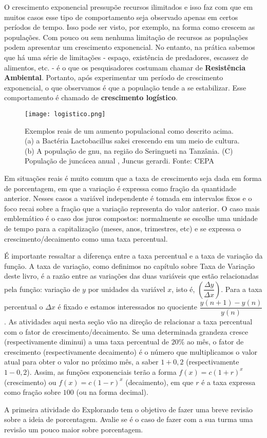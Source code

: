 \begin{reflection}
O crescimento exponencial pressupõe recursos ilimitados e isso faz com que em muitos casos esse tipo de comportamento seja observado apenas em certos períodos de tempo. Isso pode ser visto, por exemplo, na forma como crescem as populações. Com pouco ou sem nenhuma limitação de recursos as populações podem apresentar um crescimento exponencial. No entanto, na prática sabemos que há uma série de limitações - espaço, existência de predadores, escassez de alimentos, etc. - é o que os pesquisadores costumam chamar de \textbf{Resistência Ambiental}. Portanto, após experimentar um período de crescimento exponencial, o que observamos é que a população tende a se estabilizar. Esse comportamento é chamado de \textbf{crescimento logístico}.

\begin{figure}[H]
\centering
\texttt{[image: logistico.png]}
\caption{Exemplos reais de um aumento populacional como descrito acima. (a) a Bactéria Lactobacillus sakei crescendo em um meio de cultura. (b) A população de gnu, na região do Seringueti na Tanzânia. (C) População de juncácea anual , Juncus gerardi.
Fonte: CEPA}
\end{figure}

\end{reflection}
\clearpage
\def\currentcolor{session1}
\begin{texto}
{	
	Em situações reais é muito comum que a taxa de crescimento seja dada em forma de porcentagem, em que a variação é expressa como fração da quantidade anterior. Nesses casos a variável independente é tomada em intervalos fixos e o foco recai sobre a fração que a variação representa do valor anterior. O caso mais emblemático é o caso dos juros compostos: normalmente se escolhe uma unidade de tempo para a capitalização (meses, anos, trimestres, etc) e se expressa o crescimento/decaimento como uma taxa percentual.

	É importante ressaltar a diferença entre a taxa percentual e a taxa de variação da função. A taxa de variação, como definimos no capítulo sobre Taxa de Variação deste livro, é a razão entre as variações das duas variáveis que estão relacionadas pela função: variação de $y$ por unidades da variável $x$, isto é, $\left( \dfrac{\Delta{y}}{\Delta{x}}\right)$. Para a taxa percentual o $\Delta x$ é fixado e estamos interessados no quociente $\dfrac{y(n+1)-y(n)}{y(n)}$. As atividades aqui nesta seção vão na direção de relacionar a taxa percentual com o fator de crescimento/decaimento. Se uma determinada grandeza cresce (respectivamente diminui) a uma taxa percentual de $20\%$ ao mês, o fator de crescimento (respectivamente decaimento) é o número que multiplicamos o valor atual para obter o valor no próximo mês, a saber $1+0,2$ (respectivamente $1-0,2$). Assim, as funções exponenciais terão a forma $f(x)=c(1+r)^{x}$ (crescimento) ou $f(x)=c(1-r)^{x}$ (decaimento), em que $r$ é a taxa expressa como fração sobre $100$ (ou na forma decimal).

	A primeira atividade do Explorando tem o objetivo de fazer uma breve revisão sobre a ideia de porcentagem. Avalie se é o caso de fazer com a sua turma uma revisão um pouco maior sobre porcentagem.
}
\end{texto}
